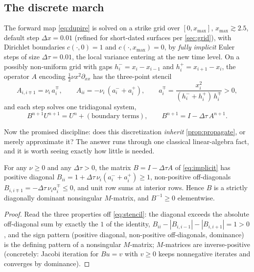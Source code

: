 \documentclass[11pt]{article}
\begin{document}
\subsection{The discrete march}

The forward map \eqref{eq:dupire} is solved on a strike grid over
$[0,x_{\max}]$, $x_{\max}\gtrsim2.5$, default step $\Delta x=0.01$
(refined for short-dated surfaces per \cref{sec:grid}), with Dirichlet
boundaries
$c(\cdot,0)=1$ and $c(\cdot,x_{\max})=0$, by \emph{fully implicit} Euler
steps of size $\Delta\tau=0.01$, the local variance entering at the new
time level.  On a possibly non-uniform grid with gaps $h^{-}_i=x_i-x_{i-1}$
and $h^{+}_i=x_{i+1}-x_i$, the operator $A$ encoding
$\tfrac12\nu x^{2}\partial_{xx}$ has the three-point stencil
\begin{equation}
A_{i,i\mp1}=\nu_i\,a^{\mp}_i,
\qquad
A_{ii}=-\nu_i\,(a^{-}_i+a^{+}_i),
\qquad
a^{\mp}_i=\frac{x_i^{2}}{(h^{-}_i+h^{+}_i)\,h^{\mp}_i}>0,
\label{eq:stencil}
\end{equation}
and each step solves one tridiagonal system,
\begin{equation}
B^{n+1}U^{n+1}=U^{n}+(\text{boundary terms}),
\qquad
B^{n+1}=I-\Delta\tau\,A^{n+1}.
\label{eq:implicit}
\end{equation}

Now the promised discipline: does this discretization \emph{inherit}
\cref{prop:propagate}, or merely approximate it?  The answer runs through
one classical linear-algebra fact, and it is worth seeing exactly how
little is needed.

\begin{proposition}
\label{prop:mmatrix}
For any $\nu\ge0$ and any $\Delta\tau>0$, the matrix $B=I-\Delta\tau A$ of
\eqref{eq:implicit} has positive diagonal
$B_{ii}=1+\Delta\tau\,\nu_i(a^{-}_i+a^{+}_i)\ge1$, non-positive
off-diagonals $B_{i,i\mp1}=-\Delta\tau\,\nu_i a^{\mp}_i\le0$, and unit row
sums at interior rows.  Hence $B$ is a strictly diagonally dominant
nonsingular $M$-matrix, and $B^{-1}\ge0$ elementwise.
\end{proposition}

\begin{proof}
Read the three properties off \eqref{eq:stencil}: the diagonal exceeds the
absolute off-diagonal sum by exactly the $1$ of the identity,
$B_{ii}-|B_{i,i-1}|-|B_{i,i+1}|=1>0$, and the sign pattern (positive
diagonal, non-positive off-diagonals, dominance) is the defining pattern of
a nonsingular $M$-matrix; $M$-matrices are inverse-positive
\cite{BermanPlemmons1994} (concretely: Jacobi iteration for $Bu=v$ with
$v\ge0$ keeps nonnegative iterates and converges by dominance).
\end{proof}
\end{document}
